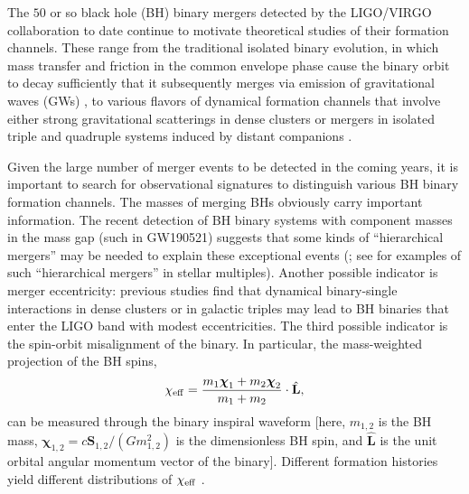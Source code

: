 \documentclass[
        fleqn,
        usenatbib,
    ]{mnras}
\newcommand*{\uv}[1]{\hat{\mathbf{#1}}}
\begin{document}
The $50$ or so black hole (BH) binary mergers detected by the LIGO/VIRGO
collaboration to date \citep{LIGOO3a} continue to motivate theoretical studies of their
formation channels. These range from the traditional isolated binary evolution,
in which mass transfer and friction in the common envelope phase cause the
binary orbit to decay sufficiently that it subsequently merges via emission of
gravitational waves (GWs) \citep[e.g.,][]{lipunov1997black,
lipunov2017first, podsiadlowski2003formation, belczynski2010effect,
belczynski2016first, dominik2012double, dominik2013double, dominik2015double},
to various flavors of dynamical formation channels that involve either strong
gravitational scatterings in dense clusters \citep[e.g.,][]{zwart1999black,
o2006binary, miller2009mergers, banerjee2010stellar, downing2010compact,
ziosi2014dynamics, rodriguez2015binary, samsing2017assembly, samsing2018black,
rodriguez2018post, gondan2018eccentric} or mergers in isolated triple and
quadruple systems induced by distant companions \citep[e.g.,][]{miller2002four,
wen2003eccentricity, antonini2012secular, antonini2017binary, silsbee2017lidov,
LL17, LL18, randall2018induced, randall2018analytical, hoang2018black,
fragione2019, fragione2019loeb, bin_misc5, LL19, LLW_apjl, bin_misc2,
bin_misc1}.

Given the large number of merger events to be detected in the coming years, it
is important to search for observational signatures to distinguish various BH
binary formation channels. The masses of merging BHs obviously carry important
information. The recent detection of BH binary systems with component masses in
the mass gap (such in GW190521) suggests that some kinds of ``hierarchical
mergers'' may be needed to explain these exceptional events (\citealp{190521};
see \citealp{bin_misc1} for examples of such ``hierarchical mergers'' in stellar
multiples). Another possible indicator is merger eccentricity: previous
studies find that dynamical binary-single interactions in dense clusters
\citep[e.g.,][]{samsing2017assembly, rodriguez2018post, samsing2018black,
fragione2019bromberg} or in galactic triples \citep{silsbee2017lidov,
antonini2017binary, fragione2019loeb, LL19} may lead to BH binaries that enter
the LIGO band with modest eccentricities. The third possible indicator is the
spin-orbit misalignment of the binary. In particular, the mass-weighted
projection of the BH spins,
\begin{equation}
    \chi_{\rm eff} = \frac{m_1 \boldsymbol{\chi}_1 + m_2\boldsymbol{\chi}_2}
    {m_1 + m_2} \cdot \uv{L},
\end{equation}
can be measured through the binary inspiral waveform [here, $m_{1,2}$ is the BH
mass, $\boldsymbol{\chi}_{1,2} = c\boldsymbol{S}_{1,2} / (Gm_{1,2}^2)$ is the
dimensionless BH spin, and $\uv{L}$ is the unit orbital angular momentum vector
of the binary]. Different formation histories yield different distributions of
$\chi_{\rm eff}$ \citep{LL17, LL18, antonini2018precessional, rodriguez2018post,
gerosa2018, LL19, su2020spin}.
\end{document}

